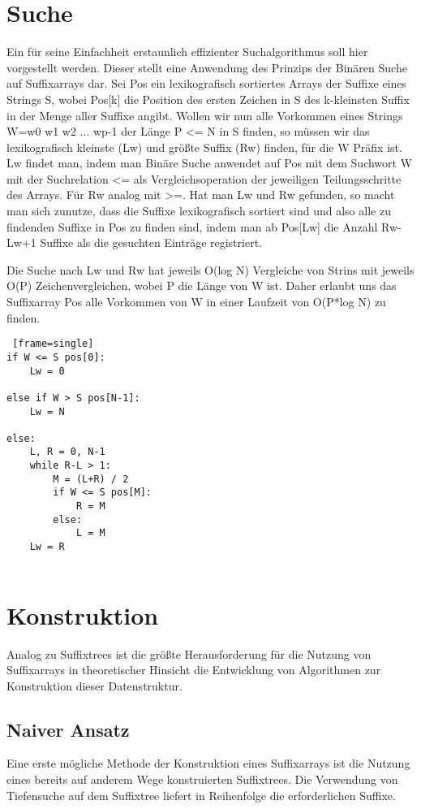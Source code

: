 \documentclass[twoside]{article}
\begin{document}
\section{Suche}
Ein für seine Einfachheit erstaunlich effizienter Suchalgorithmus soll hier
vorgestellt werden. Dieser stellt eine Anwendung des Prinzips der Binären Suche
auf Suffixarrays dar.
Sei Pos ein lexikografisch sortiertes Arrays der Suffixe eines Strings S, wobei
Pos[k] die Position des ersten Zeichen in S des k-kleinsten Suffix in der Menge
aller Suffixe angibt.
Wollen wir nun alle Vorkommen eines Strings W=w0 w1 w2 ... wp-1 der Länge P <= N
in S finden, so müssen wir das lexikografisch kleinste (Lw) und größte Suffix (Rw) finden,
für die W Präfix ist.
Lw findet man, indem man Binäre Suche anwendet auf Pos mit dem Suchwort W mit der
Suchrelation <= als Vergleichsoperation der jeweiligen Teilungsschritte des Arrays.
Für Rw analog mit >=.
Hat man Lw und Rw gefunden, so macht man sich zunutze, dass die Suffixe lexikografisch sortiert
sind und also alle zu findenden Suffixe in Pos zu finden sind, indem man ab Pos[Lw]
die Anzahl Rw-Lw+1 Suffixe als die gesuchten Einträge registriert.

Die Suche nach Lw und Rw hat jeweils O(log N) Vergleiche von Strins mit jeweils
O(P) Zeichenvergleichen, wobei P die Länge von W ist. Daher erlaubt uns das Suffixarray
Pos alle Vorkommen von W in einer Laufzeit von O(P*log N) zu finden.

\begin{lstlisting} [frame=single]
if W <= S pos[0]:
    Lw = 0

else if W > S pos[N-1]:
    Lw = N

else:
    L, R = 0, N-1
    while R-L > 1:
        M = (L+R) / 2
        if W <= S pos[M]:
            R = M
        else:
            L = M
    Lw = R


\end{lstlisting}

\section{Konstruktion}
Analog zu Suffixtrees ist die größte Herausforderung für die Nutzung von
Suffixarrays in theoretischer Hinsicht die Entwicklung von Algorithmen zur
Konstruktion dieser Datenstruktur.
\subsection{Naiver Ansatz}
Eine erste mögliche Methode der Konstruktion eines Suffixarrays ist die Nutzung
eines bereits auf anderem Wege konstruierten Suffixtrees. Die Verwendung von
Tiefensuche auf dem Suffixtree liefert in Reihenfolge die erforderlichen Suffixe.
\end{document}
